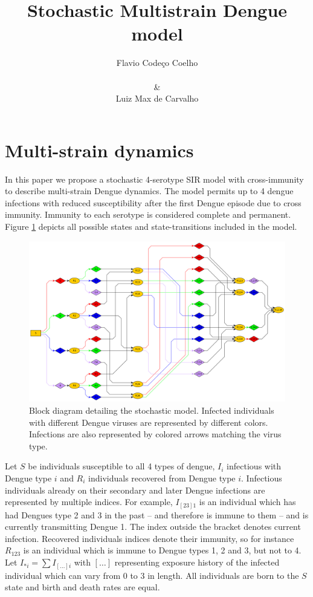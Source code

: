 \documentclass[12pt]{article}
\title{
Stochastic Multistrain Dengue model
}
\author{
Flavio Code\c{c}o Coelho \\
\\
\& \\
Luiz Max de Carvalho \\
}
\date{}
\begin{document}
                                  


%
\maketitle


\section*{Multi-strain dynamics}

In this paper we propose a stochastic 4-serotype SIR model with 
cross-immunity to describe multi-strain Dengue dynamics. 
The model permits up to 4 dengue infections 
with reduced susceptibility after the first Dengue episode due to cross 
immunity. 
Immunity to each serotype is considered complete and permanent. 
Figure \ref{fig:sde_blocks} depicts all possible states and state-transitions 
included in the 
model.

          \begin{figure}
 \centering
 \includegraphics[width=16cm]{Dengue4.png}

 \caption{Block diagram detailing the stochastic model. Infected individuals 
with different Dengue viruses are represented by different colors. Infections 
are also represented by colored arrows matching the virus type.}
 \label{fig:sde_blocks}
\end{figure}


Let $S$ be individuals susceptible to all 4 types of dengue, $I_i$ infectious 
with Dengue type $i$ and $R_i$ individuals recovered from Dengue type $i$. 
Infectious individuals already on their secondary and later Dengue infections 
are represented by multiple indices. For example, $I_{[23]1}$ is an individual 
which has had Dengues type 2 and 3 in the past -- and therefore is immune to 
them -- and is currently transmitting Dengue 1. 
The index outside the bracket 
denotes current infection. Recovered individuals indices denote their immunity, 
so for instance $R_{123}$ is an individual which is immune to Dengue types 1, 2 
and 3, but not to 4. Let $I_{*i} = \sum I_{[\ldots]i}$ with $[\ldots]$ 
representing exposure history of the infected individual which can vary from 0 
to 3 in length. 
All individuals are born to the $S$ state and birth and death 
rates are equal.
\end{document}
